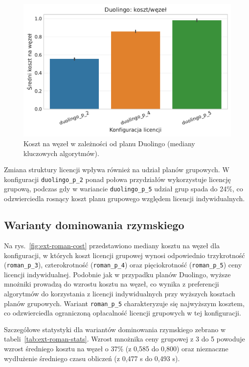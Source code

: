 \begin{figure}[H]
  \centering
  \includegraphics[width=0.6\linewidth]{assets/figures/extensions/static/duolingo_cost_per_node_comparison.pdf}
  \caption{Koszt na węzeł w zależności od planu Duolingo (mediany kluczowych algorytmów).}
  \label{fig:ext-duolingo-cost}
\end{figure}

Zmiana struktury licencji wpływa również na udział planów grupowych. W konfiguracji \texttt{duolingo\_p\_2} ponad połowa przydziałów wykorzystuje licencję grupową, podczas gdy w wariancie \texttt{duolingo\_p\_5} udział grup spada do 24\%, co odzwierciedla rosnący koszt planu grupowego względem licencji indywidualnych.

\subsection{Warianty dominowania rzymskiego}
Na rys.~\ref{fig:ext-roman-cost} przedstawiono mediany kosztu na węzeł dla konfiguracji, w których koszt licencji grupowej wynosi odpowiednio trzykrotność (\texttt{roman\_p\_3}), czterokrotność (\texttt{roman\_p\_4}) oraz pięciokrotność (\texttt{roman\_p\_5}) ceny licencji indywidualnej. Podobnie jak w przypadku planów Duolingo, wyższe mnożniki prowadzą do wzrostu kosztu na węzeł, co wynika z preferencji algorytmów do korzystania z licencji indywidualnych przy wyższych kosztach planów grupowych. Wariant \texttt{roman\_p\_5} charakteryzuje się najwyższym kosztem, co odzwierciedla ograniczoną opłacalność licencji grupowych w tej konfiguracji.

Szczegółowe statystyki dla wariantów dominowania rzymskiego zebrano w tabeli~\ref{tab:ext-roman-stats}. Wzrost mnożnika ceny grupowej z 3 do 5 powoduje wzrost średniego kosztu na węzeł o 37\% (z 0,585 do 0,800) oraz nieznaczne wydłużenie średniego czasu obliczeń (z 0,477 s do 0,493 s).

